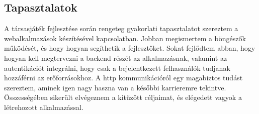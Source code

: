 \documentclass[a4paper,twoside]{article}
\begin{document}
\subsection{Tapasztalatok}
A társasjáték fejlesztése során rengeteg gyakorlati tapasztalatot szereztem a webalkalmazások készítésével kapcsolatban. Jobban megismertem a böngészők működését, és hogy hogyan segíthetik a fejlesztőket. Sokat fejlődtem abban, hogy hogyan kell megtervezni a backend részét az alkalmazásnak, valamint az autentikációt integrálni, hogy csak a bejelentkezett felhasználók tudjanak hozzáférni az erőforrásokhoz. A http kommunikációról egy magabiztos tudást szereztem, aminek igen nagy haszna van a későbbi karrieremre tekintve. Összességében sikerült elvégeznem a kitűzött céljaimat, és elégedett vagyok a létrehozott alkalmazással.


\newpage
\end{document}
